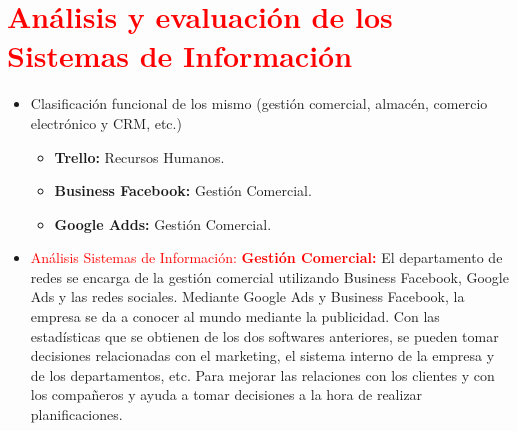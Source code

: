 \documentclass{article}
\begin{document}
\section{\textcolor{Red}{Análisis y evaluación de los Sistemas de Información}}

\begin{itemize}
\item Clasificación funcional de los mismo (gestión comercial, almacén, comercio electrónico y CRM, etc.)
\begin{itemize}
\item \textbf{Trello:}  Recursos Humanos.  
\item \textbf{Business Facebook:} Gestión Comercial. 
\item \textbf{Google Adds:} Gestión Comercial. 
\end{itemize}
\item \textcolor{Red}{Análisis Sistemas de Información:}
\textcolor{Red}{\textbf{Gestión Comercial:}} El departamento de redes se encarga de la gestión comercial utilizando Business Facebook, Google Ads y las redes sociales. Mediante Google Ads y Business Facebook, la empresa se da a conocer al mundo mediante la publicidad. Con las estadísticas que se obtienen de los dos softwares anteriores, se pueden tomar decisiones relacionadas con el marketing, el sistema interno de la empresa y de los departamentos, etc. Para mejorar las relaciones con los clientes y con los compañeros y ayuda a tomar decisiones a la hora de realizar planificaciones. 


\end{itemize}
\end{document}
